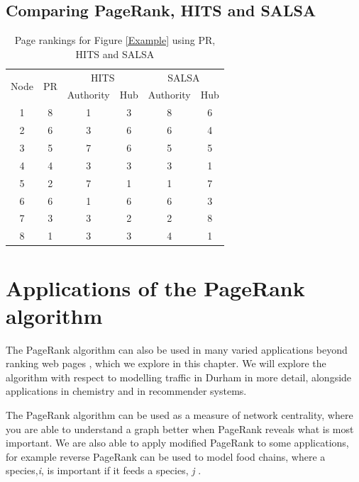 \documentclass[11pt]{report}
\begin{document}
\section{Comparing PageRank, HITS and SALSA}

\begin{table}[H] \caption{Page rankings for Figure \ref{Example} using PR, HITS and SALSA }
 \centering
 \begin{tabular} {c| c| c| c| c| c} 
 \multirow{2}{*}{Node} & \multirow{2}{*}{PR} & \multicolumn{2}{|c|}{HITS} & \multicolumn{2}{|c}{SALSA} \\ [0.5ex] 
 {}&{}&Authority & Hub & Authority & Hub\\ 
 \hline
 1&8&1&3&8&6\\
 2&6&3&6&6&4\\
 3&5&7&6&5&5\\
 4&4&3&3&3&1\\
 5&2&7&1&1&7\\
 6&6&1&6&6&3\\
 7&3&3&2&2&8\\
 8&1&3&3&4&1\\
 \end{tabular}
 \label{comparison}
\end{table}

  
  
\chapter{Applications of the PageRank algorithm}

The PageRank algorithm can also be used in many varied applications beyond ranking web pages \cite{gleich2015pagerank}, which we explore in this chapter. We will explore the algorithm with respect to modelling traffic in Durham in more detail, alongside applications in chemistry and in recommender systems. 

The PageRank algorithm can be used as a measure of network centrality, where you are able to understand a graph better when PageRank reveals what is most important. We are also able to apply modified PageRank to some applications, for example reverse PageRank can be used to model food chains, where a species,\textit{i}, is important if it feeds a species, \textit{j} \cite{allesina2009googling}. 
\end{document}
